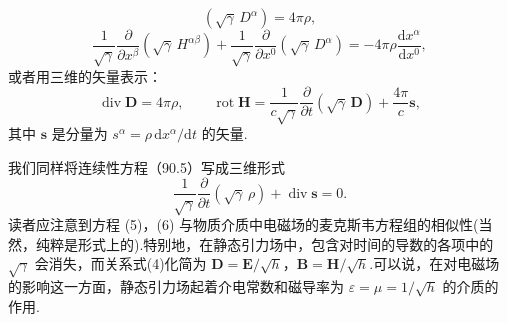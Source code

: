 \begin{xiti}
\begin{equation*}
  \left(\sqrt{\gamma}\,D^{\alpha}\right)=4\pi\rho,
\end{equation*}
\begin{equation*}
  \frac{1}{\sqrt{\gamma}}\frac{\partial}{\partial x^{\beta}}
  \left(\sqrt{\gamma}\,H^{\alpha\beta}\right)
  +\frac{1}{\sqrt{\gamma}}\frac{\partial}{\partial x^0}
  \left(\sqrt{\gamma}\,D^{\alpha}\right)
  =-4\pi\rho\frac{\mathrm{d}x^{\alpha}}{\mathrm{d}x^0},
\end{equation*}
或者用三维的矢量表示：
\begin{equation*}
  \operatorname{div}\boldsymbol{D}=4\pi\rho,\qquad
  \operatorname{rot}\boldsymbol{H}
  =\frac{1}{c\sqrt{\gamma}}\frac{\partial}{\partial t}
  \left(\sqrt{\gamma}\,\boldsymbol{D}\right)
  +\frac{4\pi}{c}\boldsymbol{s},
\tag{6}\end{equation*}
其中 $\boldsymbol{s}$ 是分量为 $s^{\alpha}=\rho\,\mathrm{d}x^{\alpha}/\mathrm{d}t$ 的矢量.

我们同样将连续性方程（90.5）写成三维形式
\begin{equation*}
  \frac{1}{\sqrt{\gamma}}\frac{\partial}{\partial t}
  \left(\sqrt{\gamma}\,\rho\right)
  +\operatorname{div}\boldsymbol{s}=0.
\tag{7}\end{equation*}
读者应注意到方程 (5)，(6) 与物质介质中电磁场的麦克斯韦方程组的相似性(当然，纯粹是形式上的).特别地，在静态引力场中，包含对时间的导数的各项中的 $\sqrt{\gamma}$ 会消失，而关系式(4)化简为 $\boldsymbol{D}=\boldsymbol{E}/\sqrt{h}$，$\boldsymbol{B}=\boldsymbol{H}/\sqrt{h}$.可以说，在对电磁场的影响这一方面，静态引力场起着介电常数和磁导率为 $\varepsilon=\mu=1/\sqrt{h}$ 的介质的作用.

\end{xiti}
